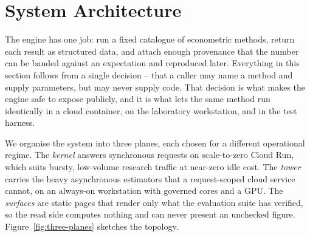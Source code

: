 \section{System Architecture}
\label{sec:architecture}

The engine has one job: run a fixed catalogue of econometric methods, return each
result as structured data, and attach enough provenance that the number can be
banded against an expectation and reproduced later. Everything in this section
follows from a single decision -- that a caller may name a method and supply
parameters, but may never supply code. That decision is what makes the engine safe
to expose publicly, and it is what lets the same method run identically in a cloud
container, on the laboratory workstation, and in the test harness.

We organise the system into three planes, each chosen for a different operational
regime. The \emph{kernel} answers synchronous requests on scale-to-zero Cloud Run,
which suits bursty, low-volume research traffic at near-zero idle cost. The
\emph{tower} carries the heavy asynchronous estimators that a request-scoped cloud
service cannot, on an always-on workstation with governed cores and a GPU. The
\emph{surfaces} are static pages that render only what the evaluation suite has
verified, so the read side computes nothing and can never present an unchecked
figure. Figure~\ref{fig:three-planes} sketches the topology.


